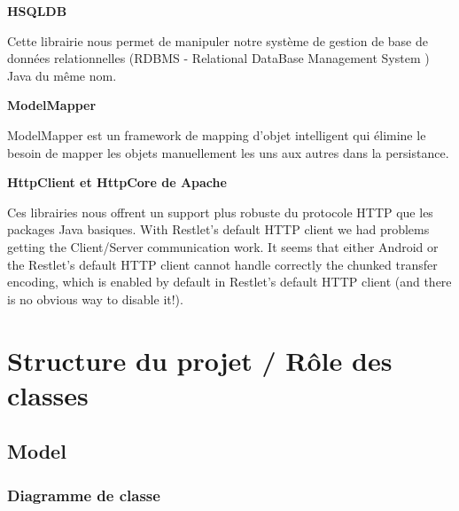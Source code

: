 \documentclass{article}
\begin{document}
\leftskip=36pt
\parindent=-18pt
{\color{color01} \textbf{HSQLDB}}

\leftskip=0pt
\parindent=0pt
{\color{color01} Cette librairie nous permet de manipuler notre système de gestion 
de base de données  relationnelles (RDBMS - Relational DataBase Management System 
) Java du même nom.}

\leftskip=36pt
\parindent=-18pt
{\color{color01} \textbf{ModelMapper}}

\leftskip=0pt
\parindent=0pt
{\color{color01} ModelMapper est un framework de mapping d'objet intelligent qui 
élimine le besoin de mapper les objets manuellement les uns aux autres dans la 
persistance.}

\leftskip=36pt
\parindent=-18pt
{\color{color01} \textbf{HttpClient et HttpCore de Apache}}

\leftskip=0pt
\parindent=0pt
{\color{color01} Ces librairies nous offrent un support plus robuste du protocole 
HTTP que les packages Java basiques. With Restlet's default HTTP client we had 
problems getting the Client/Server communication work. It seems that either Android 
or the Restlet's default HTTP client cannot handle correctly the chunked transfer 
encoding, which is enabled by default in Restlet's default HTTP client (and there 
is no obvious way to disable it!).\label{h.o7n0iqk4jgxd}}

\vspace{24pt}
\section*{{\LARGE {\color{color01} \textbf{Structure du projet / Rôle des classes\label{h.kqxmym113n0g}}}}}

\vspace{18pt}
\subsection*{{\large {\color{color01} \textbf{Model\label{h.rdjs6g2w91nu}}}}}

\vspace{14pt}
\subsubsection*{{\color{color02} \textbf{Diagramme de classe}}}
\end{document}
